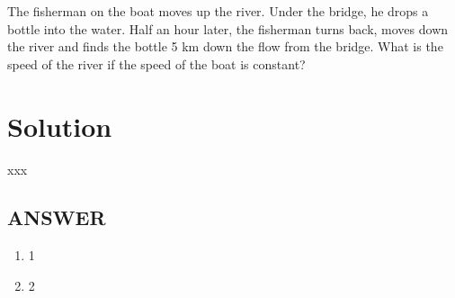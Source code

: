 The fisherman on the boat moves up the river. Under the bridge, he drops a bottle into the water.
Half an hour later, the fisherman turns back, moves down the river and finds the bottle 5 km
down the flow from the bridge. What is the speed of the river if the speed of the boat is constant?


\section*{Solution}

xxx

\vfill
\subsection*{ANSWER}
\begin{enumerate}
    \item 1
    \item 2
\end{enumerate}
